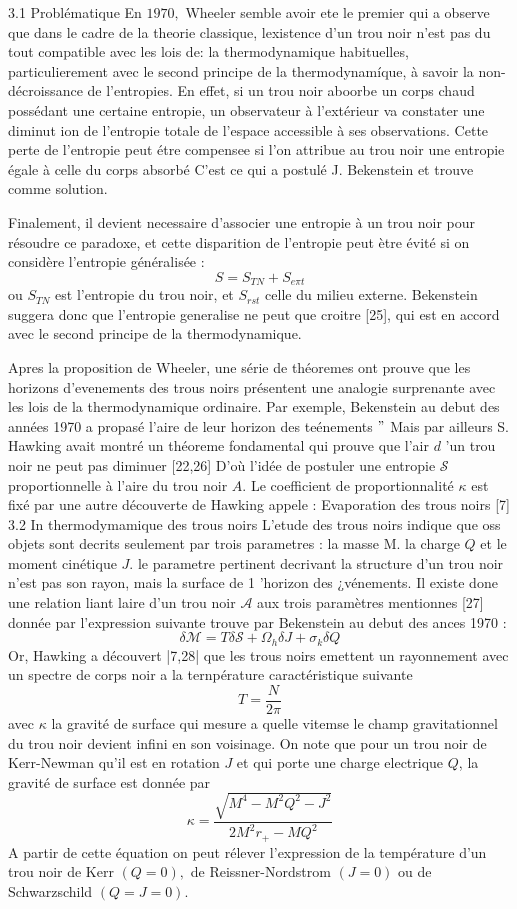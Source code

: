 \documentclass[12pt,  a4paper, openright]{report} %
\begin{document}
 

 
 

3.1 Problématique
En $1970,$ Wheeler semble avoir ete le premier qui a observe que dans le cadre de la theorie classique, lexistence d'un trou noir n'est pas du tout compatible avec les lois de:
la thermodynamique habituelles, particulierement avec le second principe de la thermodynamíque, à savoir la non-décroissance de l'entropies. En effet, si un trou noir aboorbe un corps chaud possédant une certaine entropie, un observateur à l'extérieur va constater une diminut ion de l'entropie totale de l'espace accessible à ses observations. Cette perte de l'entropie peut étre compensee si l'on attribue au trou noir une entropie égale à celle du corps absorbé C'est ce qui a postulé J. Bekenstein et trouve comme solution.

Finalement, il devient necessaire d'associer une entropie à un trou noir pour résoudre ce paradoxe, et cette disparition de l'entropie peut ètre évité si on considère l'entropie généralisée :
$$
S=S_{T N}+S_{e \pi t}
$$
ou $S_{T N}$ est l'entropie du trou noir, et $S_{r s t}$ celle du milieu externe. Bekenstein suggera donc que l'entropie generalise ne peut que croitre [25], qui est en accord avec le second principe de la thermodynamique.

Apres la proposition de Wheeler, une série de théoremes ont prouve que les horizons d'evenements des trous noirs présentent une analogie surprenante avec les lois de la thermodynamique ordinaire. Par exemple, Bekenstein au debut des années 1970 a propasé
l'aire de leur horizon des teénements $"$ Mais par ailleurs S. Hawking avait montré un théoreme fondamental qui prouve que l'air $d$ 'un trou noir ne peut pas diminuer [22,26] D'où l'idée de postuler une entropie $\mathcal{S}$ proportionnelle à l'aire du trou noir $A$. Le coefficient de proportionnalité $\kappa$ est fixé par une autre découverte de Hawking appele : Evaporation des trous noirs [7]
3.2 In thermodymamique des trous noirs
L'etude des trous noirs indique que oss objets sont decrits seulement par trois parametres : la masse M. la charge $Q$ et le moment cinétique $J$. le parametre pertinent decrivant la structure d'un trou noir n'est pas son rayon, mais la surface de 1 'horizon 
des ¿vénements. Il existe done une relation liant laire d'un trou noir $\mathcal{A}$ aux trois paramètres mentionnes [27] donnée par l'expression suivante trouve par Bekenstein au debut des ances 1970 :
$$
\delta \mathcal{M}=T \delta \mathcal{S}+\Omega_{h} \delta J+\sigma_{k} \delta Q
$$
Or, Hawking a découvert |7,28| que les trous noirs emettent un rayonnement avec un spectre de corps noir a la ternpérature caractéristique suivante
$$
T=\frac{N}{2 \pi}
$$
avec $\kappa$ la gravité de surface qui mesure a quelle vitemse le champ gravitationnel du trou noir devient infini en son voisinage. On note que pour un trou noir de Kerr-Newman qu'il est en rotation $J$ et qui porte une charge electrique $Q$, la gravité de surface est donnée par
$$
\kappa=\frac{\sqrt{M^{4}-M^{2} Q^{2}-J^{2}}}{2 M^{2} r_{+}-M Q^{2}}
$$
A partir de cette équation on peut rélever l'expression de la température d'un trou noir de Kerr $(Q=0),$ de Reissner-Nordstrom $(J=0)$ ou de Schwarzschild $(Q=J=0)$.
\end{document}
